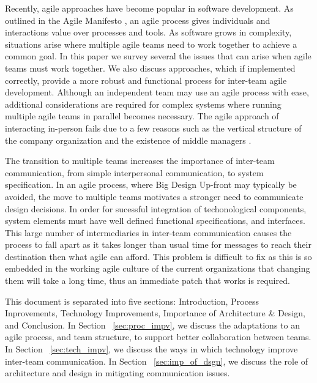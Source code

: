 
Recently, agile approaches have become popular in software development.
As outlined in the Agile Manifesto \cite{beck2001agile}, an agile process gives individuals and interactions value over processes and tools.
As software grows in complexity, situations arise where multiple agile teams need to work together to achieve a common goal.
In this paper we survey several the issues that can arise when agile teams must work together.
We also discuss approaches, which if implemented correctly, provide a more robust and functional process for inter-team agile development. 
%
Although an independent team may use an agile process with ease, additional considerations are required for complex systems where running multiple agile teams in parallel becomes necessary.
The agile approach of interacting in-person fails due to a few reasons such as the vertical structure of the company organization and the existence of middle managers \cite{dzone_article}.

The transition to multiple teams increases the importance of inter-team communication, from simple interpersonal communication, to system specification. 
In an agile process, where Big Design Up-front may typically be avoided, the move to multiple teams motivates a stronger need to communicate design decisions.
In order for sucessful integration of techonological components, system elements must have well defined functional specifications, and interfaces.
This large number of intermediaries in inter-team communication causes the process to fall apart as it takes longer than usual time for messages to reach their destination then what agile can afford.
This problem is difficult to fix as this is so embedded in the working agile culture of the current organizations that changing them will take a long time, thus an immediate patch that works is required.




This document is separated into five sections: Introduction, Process Inprovements, Technology Improvements, Importance of Architecture \& Design, and Conclusion. 
In Section ~\ref{sec:proc_impv}, we discuss the adaptations to an agile process, and team structure, to support better collaboration between teams.
In Section ~\ref{sec:tech_impv}, we discuss the ways in which technology improve inter-team communication.
In Section ~\ref{sec:imp_of_dsgn}, we discuss the role of architecture and design in mitigating communication issues.